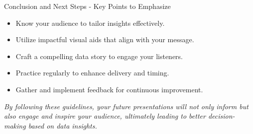 \documentclass[aspectratio=169]{beamer}
\begin{document}
\begin{frame}[fragile]{Conclusion and Next Steps - Key Points to Emphasize}
    \begin{itemize}
        \item Know your audience to tailor insights effectively.
        \item Utilize impactful visual aids that align with your message.
        \item Craft a compelling data story to engage your listeners.
        \item Practice regularly to enhance delivery and timing.
        \item Gather and implement feedback for continuous improvement.
    \end{itemize}

    \textit{By following these guidelines, your future presentations will not only inform but also engage and inspire your audience, ultimately leading to better decision-making based on data insights.}
\end{frame}
\end{document}

